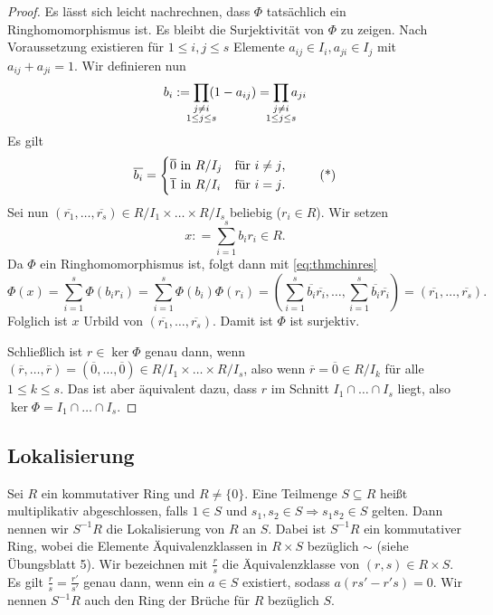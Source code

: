 \documentclass[12pt,a4paper]{scrartcl}
\begin{document}
\begin{proof}
	Es lässt sich leicht nachrechnen, dass $\Phi$ tatsächlich ein Ringhomomorphismus ist. Es bleibt die Surjektivität von $\Phi$ zu zeigen. Nach Voraussetzung existieren für $1\leq i,j\leq s$ Elemente $a_{ij}\in I_i, a_{ji}\in I_j$ mit $a_{ij}+a_{ji} = 1$. Wir definieren nun
	\[b_i := \prod_{\mathclap{\substack{j\neq i\\1\leq j\leq s}}} (1-a_{ij}) = \prod_{\mathclap{\substack{j\neq i\\1\leq j\leq s}}} a_{ji}\]
	Es gilt
	\begin{equation}
	 \overline{b_i} = \begin{cases*} \text{$\overline{0}$ in $R/I_j$} & für $i\neq j$,\\
	 \text{$\overline{1}$ in $R/I_i$} & für $i=j$.
	 \end{cases*} \tag{*}\label{eq:thmchinres}
	 \end{equation}
	 Sei nun $(\overline{r_1},\dots, \overline{r_s})\in R/I_1\times \dots \times R/I_s$ beliebig ($r_i\in R$). Wir setzen
	 \[ x : = \sum_{i = 1}^{s} b_ir_i\in R.\]
	 Da $\Phi$ ein Ringhomomorphismus ist, folgt dann mit \eqref{eq:thmchinres} \[
	 \Phi(x) = \sum_{i=1}^{s}\Phi(b_ir_i) = \sum_{i=1}^{s}\Phi(b_i)\Phi(r_i) = \left(\sum_{i =1}^{s}\overline{b_i}\overline{r_i},\dots, \sum_{i = 1}^{s}\overline{b_i}\overline{r_i}\right) = (\overline{r_1},\dots, \overline{r_s})
	 .\]
	 Folglich ist $x$ Urbild von $(\overline{r_1},\dots, \overline{r_s})$. Damit ist $\Phi$ ist surjektiv.
	 
	 Schließlich ist $r\in \ker\Phi$ genau dann, wenn $(\overline{r},\dots, \overline{r}) = (\overline{0},\dots, \overline{0})\in R/I_1\times\dots\times R/I_s$, also wenn $\overline{r} = \overline{0}\in R/I_k$ für alle $1\leq k\leq s$. Das ist aber äquivalent dazu, dass $r$ im Schnitt $I_1\cap\dots\cap I_s$ liegt, also $\ker\Phi = I_1\cap\dots\cap I_s$.
\end{proof}


\subsection{Lokalisierung}
\begin{defi} Sei $R$ ein kommutativer Ring und $R\neq \{0\}$. Eine Teilmenge $S\subseteq R$ heißt multiplikativ abgeschlossen, falls $1\in S$ und $s_1,s_2\in S\Rightarrow s_1s_2\in S$ gelten. Dann nennen wir $S^{-1}R$ die Lokalisierung von $R$ an $S$. Dabei ist $S^{-1}R$ ein kommutativer Ring, wobei die Elemente Äquivalenzklassen in $R\times S$ bezüglich $\sim$ (siehe Übungsblatt 5).
Wir bezeichnen mit $\frac rs$ die Äquivalenzklasse von $(r,s)\in R\times S$.
Es gilt $\frac rs = \frac {r'}{s'}$ genau dann, wenn ein $a\in S$ existiert, sodass $a(rs'-r's) = 0$. Wir nennen $S^{-1}R$ auch den Ring der Brüche für $R$ bezüglich $S$.
\end{defi}
\end{document}
